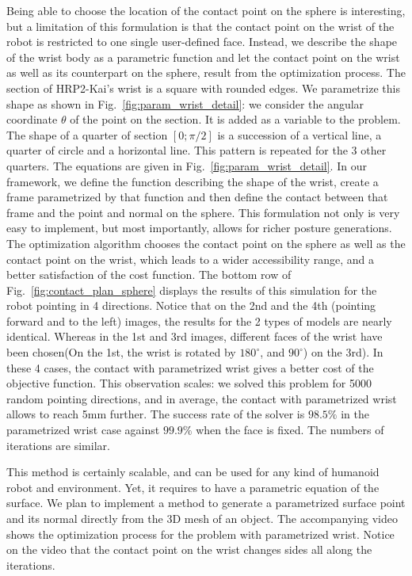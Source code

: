 Being able to choose the location of the contact point on the sphere is interesting, but a limitation of this formulation is that the contact point on the wrist of the robot is restricted to one single user-defined face.
Instead, we describe the shape of the wrist body as a parametric function and let the contact point on the wrist as well as its counterpart on the sphere, result from the optimization process.
The section of HRP2-Kai's wrist is a square with rounded edges.
We parametrize this shape as shown in Fig.~\ref{fig:param_wrist_detail}:
we consider the angular coordinate $\theta$ of the point on the section. It is added as a variable to the problem.
The shape of a quarter of section $[0;\pi/2]$ is a succession of a vertical line, a quarter of circle and a horizontal line.
This pattern is repeated for the 3 other quarters.
The equations are given in Fig.~\ref{fig:param_wrist_detail}.
In our framework, we define the function describing the shape of the wrist, create a frame parametrized by that function and then define the contact between that frame and the point and normal on the sphere.
This formulation not only is very easy to implement, but most importantly, allows for richer posture generations.
The optimization algorithm chooses the contact point on the sphere as well as the contact point on the wrist, which leads to a wider accessibility range, and a better satisfaction of the cost function.
The bottom row of Fig.~\ref{fig:contact_plan_sphere} displays the results of this simulation for the robot pointing in 4 directions.
Notice that on the 2nd and the 4th (pointing forward and to the left) images, the results for the 2 types of models are nearly identical.
Whereas in the 1st and 3rd images, different faces of the wrist have been chosen(On the 1st, the wrist is rotated by $180^{\circ}$, and $90^{\circ}$) on the 3rd).
In these 4 cases, the contact with parametrized wrist gives a better cost of the objective function.
This observation scales:
we solved this problem for 5000 random pointing directions, and in average, the contact with parametrized wrist allows to reach 5mm further.
The success rate of the solver is $98.5\%$ in the parametrized wrist case against $99.9\%$ when the face is fixed. The numbers of iterations are similar.

This method is certainly scalable, and can be used for any kind of humanoid robot and environment.
Yet, it requires to have a parametric equation of the surface.
We plan to implement a method to generate a parametrized surface point and its normal directly from the 3D mesh of an object.
The accompanying video shows the optimization process for the problem with parametrized wrist. Notice on the video that the contact point on the wrist changes sides all along the iterations.

